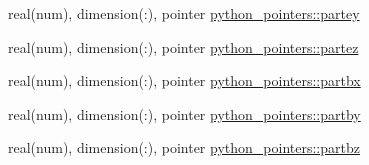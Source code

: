 \begin{DoxyCompactItemize}
$$\item 
real(num), dimension(\+:), pointer \hyperlink{namespacepython__pointers_af358e4be4f10aeff30df94181589c382}{python\+\_\+pointers\+::partey}
\item 
real(num), dimension(\+:), pointer \hyperlink{namespacepython__pointers_a61f858897e873f37d7bb3e355e2b9740}{python\+\_\+pointers\+::partez}
\item 
real(num), dimension(\+:), pointer \hyperlink{namespacepython__pointers_a9de58f9a1f88381cac4457014ee8859f}{python\+\_\+pointers\+::partbx}
\item 
real(num), dimension(\+:), pointer \hyperlink{namespacepython__pointers_aab1fc483934951de61c30198fa476e40}{python\+\_\+pointers\+::partby}
\item 
real(num), dimension(\+:), pointer \hyperlink{namespacepython__pointers_a9c50a4b64ff01114243eebc0dc729ae8}{python\+\_\+pointers\+::partbz}
\end{DoxyCompactItemize}
